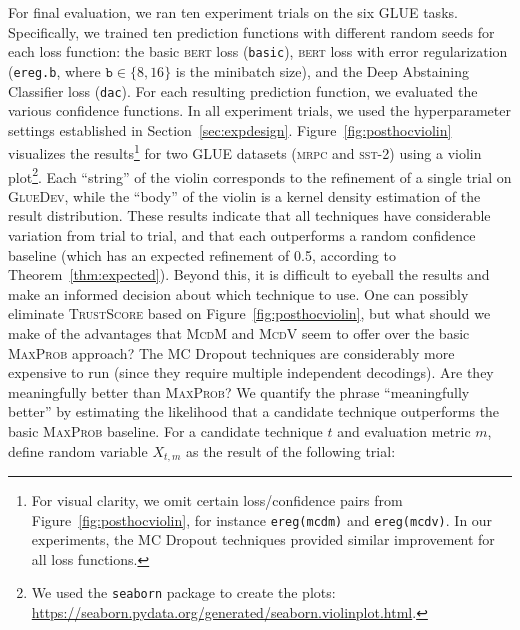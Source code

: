 \documentclass[11pt]{article}
\begin{document}
For final evaluation, we ran ten experiment trials on the six GLUE tasks. Specifically, we trained ten prediction functions with different random seeds for each loss function: the basic \textsc{bert} loss (\texttt{basic}), \textsc{bert} loss with error regularization (\texttt{ereg.b}, where $\texttt{b} \in \{8, 16\}$ is the minibatch size), and the Deep Abstaining Classifier loss (\texttt{dac}). For each resulting prediction function, we evaluated the various confidence functions. In all experiment trials, we used the hyperparameter settings established in Section~\ref{sec:expdesign}. Figure~\ref{fig:posthocviolin} visualizes the results\footnote{For visual clarity, we omit certain loss/confidence pairs from Figure~\ref{fig:posthocviolin}, for instance \texttt{ereg(mcdm)} and \texttt{ereg(mcdv)}. In our experiments, the MC Dropout techniques provided similar improvement for all loss functions.} for two GLUE datasets (\textsc{mrpc} and \textsc{sst-2}) using a violin plot\footnote{We used the \texttt{seaborn} package to create the plots: \url{https://seaborn.pydata.org/generated/seaborn.violinplot.html}.}. Each ``string'' of the violin corresponds to the refinement of a single trial on \textsc{GlueDev}, while the ``body'' of the violin is a kernel density estimation of the result distribution. These results indicate that all techniques have considerable variation from trial to trial, and that each outperforms a random confidence baseline (which has an expected refinement of 0.5, according to Theorem~\ref{thm:expected}). Beyond this, it is difficult to eyeball the results and make an informed decision about which technique to use. One can possibly eliminate \textsc{TrustScore} based on Figure~\ref{fig:posthocviolin}, but what should we make of the advantages that \textsc{McdM} and \textsc{McdV} seem to offer over the basic \textsc{MaxProb} approach? The MC Dropout techniques are considerably more expensive to run (since they require multiple independent decodings). Are they meaningfully better than \textsc{MaxProb}? We quantify the phrase ``meaningfully better'' by estimating the likelihood that a candidate technique outperforms the basic \textsc{MaxProb} baseline. For a candidate technique $t$ and evaluation metric $m$, define random variable $X_{t,m}$ as the result of the following trial: 
\end{document}
